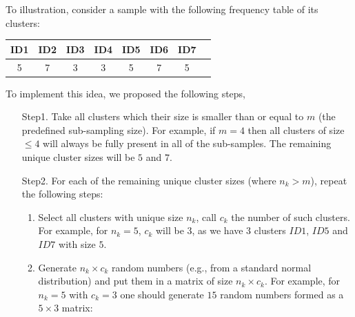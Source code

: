 \documentclass[11pt,a5paper,twoside]{book}
\begin{document}
To illustration, consider a sample with the following frequency table of its clusters:
	\begin{center}
		\begin{tabular}{ c c c c c c c c}
			ID1 & ID2 & ID3 & ID4 & ID5& ID6 & ID7 \\ \hline
			5 & 7 & 3  & 3 & 5 &7 &5 
		\end{tabular}
	\end{center}
To implement this idea, we proposed the following steps,

\begin{enumerate}
	\item [Step1. ] Take all clusters which their size is smaller than or equal to $m$ (the predefined sub-sampling size). For example, if $m=4$ then all clusters of size $\leq 4$ will always be fully present in all of the sub-samples. The remaining unique cluster sizes will be $5$ and $7$.
	\item [Step2. ] For each of the remaining unique cluster sizes (where $n_k > m$), repeat the following steps:
	\begin{enumerate}
		\item Select all clusters with unique size $n_k$, call $c_k$ the number of such clusters. For example, for $n_k=5$, $c_k$ will be $3$, as we have 3 clusters $ID1$, $ID5$ and $ID7$ with size $5$. 
		\item Generate $n_k\times c_k$ random numbers (e.g., from a standard normal distribution) and put them in a matrix of size $n_k \times c_k$. For example, for $n_k=5$ with $c_k=3$ one should generate $15$ random numbers formed as a $5\times 3$ matrix:

\end{enumerate}
\end{enumerate}
\end{document}

